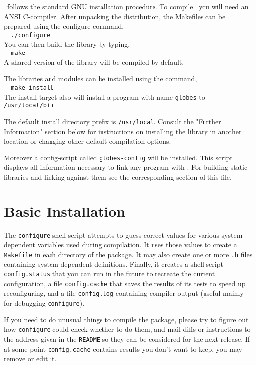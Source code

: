 \GLOBES\ follows the standard GNU installation procedure.  To compile
\GLOBES\ you will need an ANSI C-compiler.  After unpacking the
distribution, the Makefiles can be prepared using the configure
command,\\
\verb+  ./configure+\\
You can then build the library by typing,\\
\verb+  make+\\
A shared  version of the library will be compiled by
default. 
 
The libraries and modules can be installed using the command,\\
\verb+  make install+\\
The install target also will install a program with name \verb+globes+
 to \verb+/usr/local/bin+

The default install directory prefix is \verb+/usr/local+.  Consult the
"Further Information" section below for instructions on installing the
library in another location or changing other default compilation
options.

Moreover a config-script called \verb+globes-config+ will be
installed. This script displays all information necessary to link any
program with \GLOBES.  For building static libraries and linking against
them see the corresponding section of this file.
 
                    

\section*{Basic Installation}



   The \verb+configure+ shell script attempts to guess correct values for
various system-dependent variables used during compilation.  It
uses those values to create a \verb+Makefile+ in each directory of the
package.  It may also create one or more \verb+.h+ files containing
system-dependent definitions.  Finally, it creates a shell script
\verb+config.status+ that you can run in the future to recreate the
current configuration, a file \verb+config.cache+ that saves the results
of its tests to speed up reconfiguring, and a file \verb+config.log+
containing compiler output (useful mainly for debugging
\verb+configure+).

   If you need to do unusual things to compile the package, please try
to figure out how \verb+configure+ could check whether to do them, and mail
diffs or instructions to the address given in the \verb+README+ so they can
be considered for the next release.  If at some point \verb+config.cache+
contains results you don't want to keep, you may remove or edit it.

